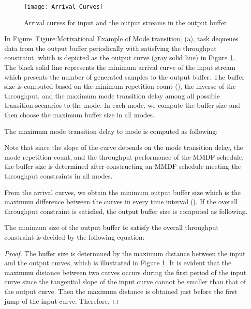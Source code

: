 \documentclass[prodmode,acmtecs]{acmsmall}
\begin{document}
\begin{figure} [ht]
\centerline{\texttt{[image: Arrival\_Curves]}}
\caption{Arrival curves for input and the output streams in the output buffer}
\label{Figure:Arribal Curves}
\end{figure}

In Figure \ref{Figure:Motivational Example of Mode transition} (a), task  dequeues data from the output buffer periodically with satisfying the throughput constraint, which is depicted as the output curve (gray solid line) in Figure \ref{Figure:Arribal Curves}. The black solid line represents the minimum arrival curve of the input stream which presents the number of generated samples to the output buffer. The buffer size is computed based on the minimum repetition count (), the inverse of the throughput, and the maximum mode transition delay among all possible transition scenarios to the mode. In each mode, we compute the buffer size and then choose the maximum buffer size in all modes.

The maximum mode transition delay to mode  is computed as following: 

\begin{definition}
\label{Definition:Worst Case Mode Transition Delay}

\end{definition}

Note that since the slope of the curve depends on the mode transition delay, the mode repetition count, and the throughput performance of the MMDF schedule, the buffer size is determined after constructing an MMDF schedule meeting the throughput constraints in all modes. 

From the arrival curves, we obtain the minimum output buffer size which is the maximum difference between the curves in every time interval (). If the overall throughput constraint is satisfied, the output buffer size is computed as following.

\begin{theorem}  The minimum size of the output buffer to satisfy the overall throughput constraint is decided by the following equation:
\label{Theorem:Output Buffer Size}

\end{theorem}

\begin{proof}
The buffer size is determined by the maximum distance between the input and the output curves, which is illustrated in Figure \ref{Figure:Arribal Curves}. It is evident that the maximum distance between two curves occurs during the first period of the input curve since the tangential slope of the input curve cannot be smaller than that of the output curve. Then the maximum distance is obtained just before the first jump of the input curve. Therefore,

\end{proof}
\end{document}
